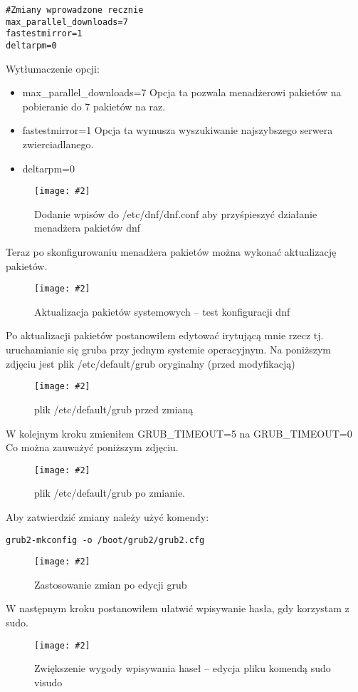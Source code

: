 \documentclass[a4paper]{article}
\newcommand*{\zdj}[2][\textwidth]{\texttt{[image: \#2]}}
\newcommand*{\fg}[4][!htb]{
      \begin{figure*}[#1]
            \zdj{#2}
            \caption[#4]{#3}
      \end{figure*}
}
\begin{document}
\begin{Verbatim}[frame=single]
#Zmiany wprowadzone recznie
max_parallel_downloads=7
fastestmirror=1
deltarpm=0
\end{Verbatim}

Wytłumaczenie opcji: \\

\begin{itemize}
\item max\_parallel\_downloads=7
Opcja ta pozwala menadżerowi pakietów na pobieranie do 7 pakietów na raz.
\item fastestmirror=1
Opcja ta wymusza wyszukiwanie najszybszego serwera zwierciadlanego.
\item deltarpm=0
\end{itemize}

\fg{contents/OS_installation/Fedora40/17.png}{Dodanie wpisów do /etc/dnf/dnf.conf aby przyśpieszyć działanie menadżera pakietów dnf}{Konfiguracja dnf}


\newpage
Teraz po skonfigurowaniu menadżera pakietów można wykonać aktualizację pakietów.
\fg{contents/OS_installation/Fedora40/18.png}{Aktualizacja pakietów systemowych – test konfiguracji dnf}{Aktualizacja pakietów}


Po aktualizacji pakietów postanowiłem edytować irytującą mnie rzecz tj. uruchamianie się gruba przy jednym systemie operacyjnym.
Na poniższym zdjęciu jest plik /etc/default/grub oryginalny (przed modyfikacją)
\fg{contents/OS_installation/Fedora40/21.png}{plik /etc/default/grub przed zmianą}{plik /etc/default/grub przed zmianą}
\newpage
W kolejnym kroku zmieniłem GRUB\_TIMEOUT=5 na GRUB\_TIMEOUT=0
Co można zauważyć poniższym zdjęciu.
\fg{contents/OS_installation/Fedora40/22.png}{plik /etc/default/grub po zmianie.}{plik /etc/default/grub po zmianie}


Aby zatwierdzić zmiany należy użyć komendy: 
\begin{Verbatim}[frame=single]
grub2-mkconfig -o /boot/grub2/grub2.cfg
\end{Verbatim}
\fg{contents/OS_installation/Fedora40/24.png}{Zastosowanie zmian po edycji grub}{Zastosowanie zmian po edycji grub}
\newpage
W następnym kroku postanowiłem ułatwić wpisywanie hasła, gdy korzystam z sudo.
\fg{contents/OS_installation/Fedora40/25.png}{Zwiększenie wygody wpisywania haseł – edycja pliku komendą sudo visudo}{Zwiększenie wygody wpisywania haseł}
\end{document}
